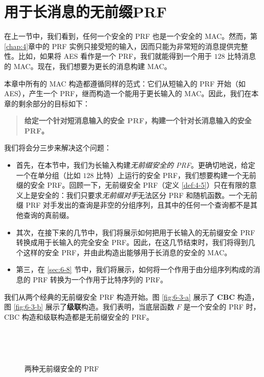 \section{用于长消息的无前缀PRF}\label{sec:6-4}

在上一节中，我们看到，任何一个安全的 PRF 也是一个安全的 MAC。然而，第\ref{chap:4}章中的 PRF 实例只接受短的输入，因而只能为非常短的消息提供完整性。比如，如果将 AES 看作是一个 PRF，我们就能得到一个用于 $128$ 比特消息的 MAC。现在，我们想要为更长的消息构建 MAC。

本章中所有的 MAC 构造都遵循同样的范式：它们从短输入的 PRF 开始（如 AES），产生一个 PRF，继而构造一个能用于更长输入的 MAC。因此，我们在本章的剩余部分的目标如下：
\begin{quote}
\textbf{给定一个针对短消息输入的安全 PRF，构建一个针对长消息输入的安全 PRF。}
\end{quote}
我们将会分三步来解决这个问题：
\begin{itemize}
	\item 首先，在本节中，我们为长输入构建\emph{无前缀安全的 PRF}。更确切地说，给定一个在单分组（比如 $128$ 比特）上运行的安全 PRF，我们想要构建一个无前缀的安全 PRF。回顾一下，无前缀安全 PRF（定义 \ref{def:4-5}）只在有限的意义上是安全的：我们只要求\emph{无前缀对手}无法区分 PRF 和随机函数。一个无前缀 PRF 对手发出的查询是非空的分组序列，且其中的任何一个查询都不是其他查询的真前缀。
	\item 其次，在接下来的几节中，我们将展示如何把用于长输入的无前缀安全 PRF 转换成用于长输入的完全安全 PRF。因此，在这几节结束时，我们将得到几个这样的安全 PRF，并由此构造出能够用于长消息的安全的 MAC。
	\item 第三，在 \ref{sec:6-8} 节中，我们将展示，如何将一个作用于由分组序列构成的消息的 PRF 转换为一个作用于比特序列的 PRF。
\end{itemize}

\begin{snote}
我们从两个经典的无前缀安全 PRF 构造开始。图 \ref{fig:6-3-a} 展示了 \textbf{CBC} 构造，图 \ref{fig:6-3-b} 展示了\textbf{级联}构造。我们表明，当底层函数 $F$ 是一个安全的 PRF 时，CBC 构造和级联构造都是无前缀安全的 PRF。
\end{snote}

\begin{figure}
  \centering
  
  \,
  
  \,
  
  \subfigure[级联构造$F^*(k,m)$]{
  	
  	\label{fig:6-3-b}
  }
  \caption{两种无前缀安全的 PRF}
\end{figure}

